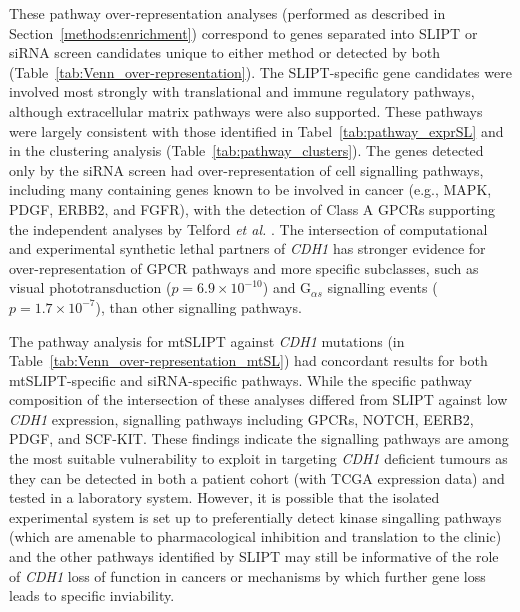 These pathway over-representation analyses (performed as described in Section~\ref{methods:enrichment}) correspond to genes separated into \gls{SLIPT} or siRNA screen candidates unique to either method or detected by both (Table~\ref{tab:Venn_over-representation}). The \gls{SLIPT}-specific gene candidates were involved most strongly with translational and immune regulatory pathways, although extracellular matrix pathways were also supported. These pathways were largely consistent with those identified in Tabel~\ref{tab:pathway_exprSL} and in the clustering analysis (Table~\ref{tab:pathway_clusters}). The genes detected only by the siRNA screen had over-represent\-ation of cell signalling pathways, including many containing genes known to be involved in cancer (e.g., MAPK, PDGF, ERBB2, and FGFR), with the detection of Class A GPCRs supporting the independent analyses by  Telford \textit{et al.} \cite{Telford2015}. The intersection of computational and experimental synthetic lethal partners of \textit{CDH1} has stronger evidence for over-represent\-ation of GPCR pathways and more specific subclasses, such as visual phototransduction ($p=6.9 \times 10^{-10}$) and G$_{\alpha s}$ signalling events ($p=1.7 \times 10^{-7}$), than other signalling pathways.

The pathway analysis for mtSLIPT against \textit{CDH1} mutations (in Table~\ref{tab:Venn_over-representation_mtSL}) had concordant results for both mtSLIPT-specific and siRNA-specific pathways. While the specific pathway composition of the intersection of these analyses differed from \gls{SLIPT} against low \textit{CDH1} expression, signalling pathways including GPCRs, NOTCH, EERB2, PDGF, and SCF-KIT. These findings indicate the signalling pathways are among the most suitable vulnerability to exploit in targeting \textit{CDH1} deficient tumours as they can be detected in both a patient cohort (with TCGA expression data) and tested in a laboratory system. However, it is possible that the isolated experimental system is set up to preferentially detect kinase singalling pathways (which are amenable to pharmacological inhibition and translation to the clinic) and the other pathways identified by \gls{SLIPT} may still be informative of the role of \textit{CDH1} loss of function in cancers or mechanisms by which further gene loss leads to specific inviability.



\FloatBarrier

 \label{chapt3:compare_pathway_perm}

